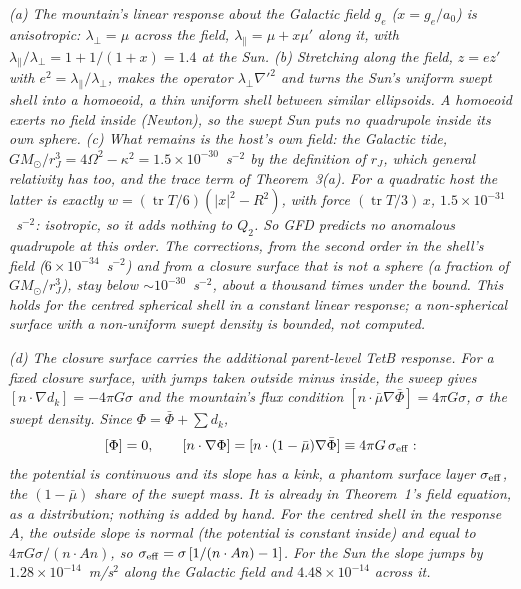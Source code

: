 \documentclass[twocolumn]{iopjournal}
\begin{document}
\emph{(a) The mountain's linear response about the Galactic field
$g_e$ ($x = g_e/a_0$) is anisotropic: $\lambda_\perp = \mu$ across the
field, $\lambda_\parallel = \mu + x\mu'$ along it, with
$\lambda_\parallel/\lambda_\perp = 1 + 1/(1+x) = 1.4$ at the Sun.
(b) Stretching along the field, $z = e z'$ with
$e^2 = \lambda_\parallel/\lambda_\perp$, makes the operator
$\lambda_\perp\nabla'^2$ and turns the Sun's uniform swept shell into a
homoeoid, a thin uniform shell between similar ellipsoids. A homoeoid
exerts no field inside (Newton), so the swept Sun puts no quadrupole
inside its own sphere. (c) What remains is the host's own field:
the Galactic tide, $GM_\odot/r_J^3 = 4\Omega^2 - \kappa^2 =
1.5\times10^{-30}$~s$^{-2}$ by the definition of $r_J$, which general
relativity has too, and the trace term of Theorem~3(a). For a
quadratic host the latter is exactly $w = (\operatorname{tr}T/6)
(|x|^2 - R^2)$, with force $(\operatorname{tr}T/3)\,x$,
$1.5\times10^{-31}$~s$^{-2}$: isotropic, so it adds nothing to $Q_2$.
So GFD predicts no anomalous quadrupole at this order. The corrections,
from the second order in the shell's field ($6\times10^{-34}$~s$^{-2}$)
and from a closure surface that is not a sphere (a fraction of
$GM_\odot/r_J^3$), stay below $\sim 10^{-30}$~s$^{-2}$, about a thousand
times under the bound. This holds for the centred spherical shell in a
constant linear response; a non-spherical surface with a non-uniform
swept density is bounded, not computed.}

\emph{(d) The closure surface carries the additional parent-level TetB response. For a fixed
closure surface, with jumps taken outside minus inside, the sweep
gives $[n\cdot\nabla d_k] = -4\pi G\sigma$ and the mountain's flux
condition $[n\cdot\bar\mu\nabla\bar\Phi] = 4\pi G\sigma$, $\sigma$ the
swept density. Since $\Phi = \bar\Phi + \sum d_k$,
\[
[\Phi] = 0,\qquad [n\cdot\nabla\Phi] = [n\cdot(1-\bar\mu)\nabla\bar\Phi]
\equiv 4\pi G\,\sigma_{\rm eff}:
\]
the potential is continuous and its slope has a kink, a phantom surface
layer $\sigma_{\rm eff}$, the $(1-\bar\mu)$ share of the swept mass.
It is already in Theorem~1's field equation, as a distribution; nothing
is added by hand. For the centred shell in the response $A$, the outside
slope is normal (the potential is constant inside) and equal to
$4\pi G\sigma/(n\cdot An)$, so $\sigma_{\rm eff} = \sigma\,[1/(n\cdot An) -
1]$. For the Sun the slope jumps by $1.28\times10^{-14}$~m/s$^2$ along
the Galactic field and $4.48\times10^{-14}$ across it.}
\end{document}
